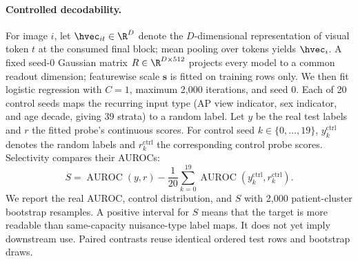 \paragraph{Controlled decodability.}
For image $i$, let $\hvec_{it}\in\R^D$ denote the $D$-dimensional representation of visual token $t$ at the consumed final block; mean pooling over tokens yields $\hvec_i$. A fixed seed-0 Gaussian matrix $R\in\R^{D\times512}$ projects every model to a common readout dimension; featurewise scale $\boldsymbol{s}$ is fitted on training rows only. We then fit logistic regression with $C=1$, maximum 2,000 iterations, and seed 0. Each of 20 control seeds maps the recurring input type (AP view indicator, sex indicator, and age decade, giving 39 strata) to a random label. Let $y$ be the real test labels and $r$ the fitted probe's continuous scores. For control seed $k\in\{0,\ldots,19\}$, $y_k^{\mathrm{ctrl}}$ denotes the random labels and $r_k^{\mathrm{ctrl}}$ the corresponding control probe scores. Selectivity compares their AUROCs:
\begin{equation}
S = \operatorname{AUROC}(y,r)-\frac{1}{20}\sum_{k=0}^{19}\operatorname{AUROC}(y_k^{\mathrm{ctrl}},r_k^{\mathrm{ctrl}}).
\label{eq:selectivity}
\end{equation}
We report the real AUROC, control distribution, and $S$ with 2,000 patient-cluster bootstrap resamples. A positive interval for $S$ means that the target is more readable than same-capacity nuisance-type label maps. It does not yet imply downstream use. Paired contrasts reuse identical ordered test rows and bootstrap draws.

